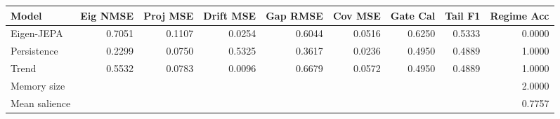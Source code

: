 \begin{tabular}{lrrrrrrrr}
\toprule
Model & Eig NMSE & Proj MSE & Drift MSE & Gap RMSE & Cov MSE & Gate Cal & Tail F1 & Regime Acc \\
\midrule
Eigen-JEPA & 0.7051 & 0.1107 & 0.0254 & 0.6044 & 0.0516 & 0.6250 & 0.5333 & 0.0000 \\
Persistence & 0.2299 & 0.0750 & 0.5325 & 0.3617 & 0.0236 & 0.4950 & 0.4889 & 1.0000 \\
Trend & 0.5532 & 0.0783 & 0.0096 & 0.6679 & 0.0572 & 0.4950 & 0.4889 & 1.0000 \\
\midrule
Memory size & \multicolumn{8}{r}{2.0000} \\
Mean salience & \multicolumn{8}{r}{0.7757} \\
\bottomrule
\end{tabular}